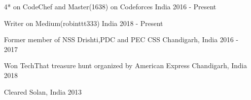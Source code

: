 


\begin{cvhonors}

\cvhonor
{} %
{4* on CodeChef and Master(1638) on Codeforces} %
{India} %
{2016 - Present} %

\cvhonor
{} %
{Writer on Medium(robinttt333)} %
{India} %
{2018 - Present} %

\cvhonor
{} %
{Former member of NSS Drishti,PDC and PEC CSS} %
{Chandigarh, India} %
{2016 - 2017} %

\cvhonor
{} %
{Won TechThat treasure hunt organized by American Express } %
{Chandigarh, India} %
{2018} %
    
\cvhonor
{} %
{Cleared } %
{Solan, India} %
{2013} %
    

\end{cvhonors}